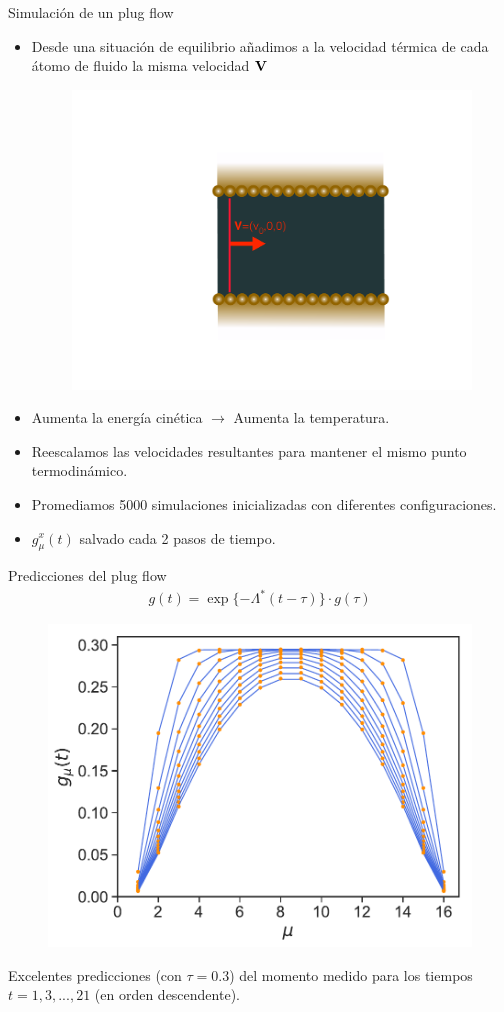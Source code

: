 \documentclass{beamer}
\newcommand{\esc}{\!\cdot\!}
\begin{document}
\begin{frame}{Simulación de un plug flow}
  \begin{itemize}
    \item<1-> Desde una situación de equilibrio añadimos a la velocidad térmica de cada átomo de fluido la misma velocidad $\bf{V}$ 
\begin{figure}[]
  \includegraphics[width=0.3\linewidth]{plug_flow}
\end{figure}
\item<2-> Aumenta la energía cinética $\rightarrow$ Aumenta la temperatura.
\item<3-> Reescalamos las velocidades resultantes para mantener el mismo punto termodinámico.
\item<4-> Promediamos 5000 simulaciones inicializadas con diferentes configuraciones. 
\item<5-> $g^x_{\mu}(t)$ salvado cada 2 pasos de tiempo.
  \end{itemize}
\end{frame}

\begin{frame}{Predicciones del plug flow}
  \begin{align}
    g(t)=\exp\{-\Lambda^* (t-\tau)\}\esc g(\tau)
    \nonumber
\end{align}
\begin{figure}[!h]
\includegraphics[width=0.55\linewidth]{gxtPredictions-17nodes-WALLS-defense1}
\end{figure}
  Excelentes {\color{orange} predicciones} (con $\tau=0.3$) del {\color{blue} momento medido} para los tiempos $t=1,3,...,21$ (en orden descendente).
\end{frame}
\end{document}
